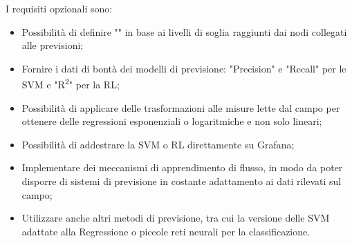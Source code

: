 \documentclass[../analisi-dei-requisiti.tex]{subfiles}
\begin{document}
	I requisiti opzionali sono:
	\begin{itemize}
		\item{Possibilità di definire "" in base ai livelli di soglia raggiunti dai nodi collegati alle previsioni;}
		\item{Fornire i dati di bontà dei modelli di previsione: "Precision" e "Recall" per le SVM e "R\textsuperscript{2}" per la RL;}
		\item{Possibilità di applicare delle trasformazioni alle misure lette dal campo per ottenere delle regressioni esponenziali o logaritmiche e non solo lineari;}
		\item{Possibilità di addestrare la SVM o RL direttamente su Grafana;}
		\item{Implementare dei meccanismi di apprendimento di flusso, in modo da poter disporre di sistemi di previsione in costante adattamento ai dati rilevati sul campo;}
		\item{Utilizzare anche altri metodi di previsione, tra cui la versione delle SVM adattate alla Regressione o piccole reti neurali per la classificazione.}
	\end{itemize}
\end{document}
